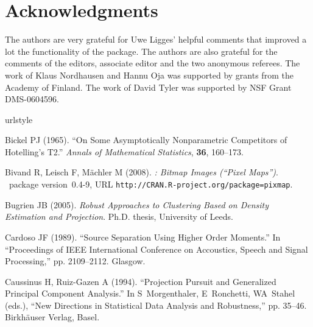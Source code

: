 \documentclass[article,nojss]{jss}
\begin{document}
\section*{Acknowledgments}

The authors are very grateful for Uwe Ligges' helpful comments that improved a lot the functionality of the package.
The authors are also grateful for the comments of the editors, associate editor and the two anonymous referees.
The work of Klaus Nordhausen and Hannu Oja was supported by grants from the Academy of Finland. The work of David
Tyler was supported by NSF Grant DMS-0604596.

\begin{thebibliography}{33}
\newcommand{\enquote}[1]{``#1''}
\providecommand{\natexlab}[1]{#1}
\providecommand{\url}[1]{\texttt{#1}}
\providecommand{\urlprefix}{URL }
\expandafter\ifx\csname urlstyle\endcsname\relax
  \providecommand{\doi}[1]{doi:\discretionary{}{}{}#1}\else
  \providecommand{\doi}{doi:\discretionary{}{}{}\begingroup
  \urlstyle{rm}\Url}\fi
\providecommand{\eprint}[2][]{\url{#2}}

Bickel PJ (1965).
\newblock \enquote{On Some Asymptotically Nonparametric Competitors of
  Hotelling's T2.}
\newblock \emph{Annals of Mathematical Statistics}, \textbf{36}, 160--173.

Bivand R, Leisch F, M{\"a}chler M (2008).
\newblock \emph{: Bitmap Images (``Pixel Maps'')}.
\newblock {}~package version~0.4-9,
  \urlprefix\url{http://CRAN.R-project.org/package=pixmap}.

Bugrien JB (2005).
\newblock \emph{Robust Approaches to Clustering Based on Density Estimation and
  Projection}.
\newblock Ph.D. thesis, University of Leeds.

Cardoso JF (1989).
\newblock \enquote{Source Separation Using Higher Order Moments.}
\newblock In \enquote{Proceedings of IEEE International Conference on
  Accoustics, Speech and Signal Processing,} pp. 2109--2112. Glasgow.

Caussinus H, Ruiz-Gazen A (1994).
\newblock \enquote{Projection Pursuit and Generalized Principal Component
  Analysis.}
\newblock In S~Morgenthaler, E~Ronchetti, WA~Stahel (eds.), \enquote{New
  Directions in Statistical Data Analysis and Robustness,} pp. 35--46.
  Birkh{\"a}user Verlag, Basel.


\end{thebibliography}
\end{document}
